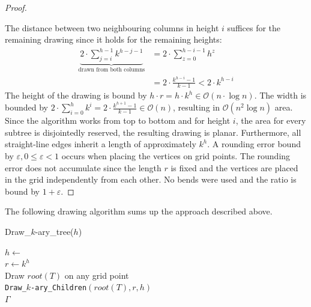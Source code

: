 \begin{proof}
\begin{figure}[H]
\end{figure}
	The distance between two neighbouring columns in height $i$ suffices for the remaining drawing since it holds for the remaining heights:
	\begin{align}
		\underbrace{2\cdot \sum_{j=i}^{h-1} k^{h-j-1}}_{\text{drawn from both columns}} &= 2\cdot\sum_{z = 0}^{h-i-1}h^z\\
		&= 2\cdot\frac{k^{h-i}-1}{k-1} < 2\cdot k^{h-i}
	\end{align}
	The height of the drawing is bound by $h\cdot r = h\cdot k^h \in \mathcal{O}(n\cdot \log n)$. 
	The width is bounded by $2\cdot\sum_{i = 0}^{h} k^i = 2\cdot \frac{k^{h+1}-1}{k-1} \in \mathcal{O}(n)$, resulting in $\mathcal{O}(n^2\log n)$ area.\\ 
	Since the algorithm works from top to bottom and for height $i$, the area for every subtree is disjointedly reserved, the resulting drawing is planar. Furthermore, all straight-line edges inherit a length of approximately $k^h$. A rounding error bound by $\varepsilon, 0\leq \varepsilon<1$ occurs when placing the vertices on grid points. The rounding error does not accumulate since the length $r$ is fixed and the vertices are placed in the grid independently from each other. No bends were used and the ratio is bound by $1+\varepsilon$.
\end{proof}
\bigskip
The following drawing algorithm sums up the approach described above.\\
\begin{algorithm}[H]
	\caption{Draw\_$k$-ary\_tree($h$)}\label{al:complete_k-ary_tree}
	$h \gets $ \\
	$r \gets k^h$\\
	Draw $root(T)$ on any grid point\\
	\texttt{Draw\_$k$-ary\_Children}$(root(T),r,h)$\\
	\Return $\Gamma$
\end{algorithm}

